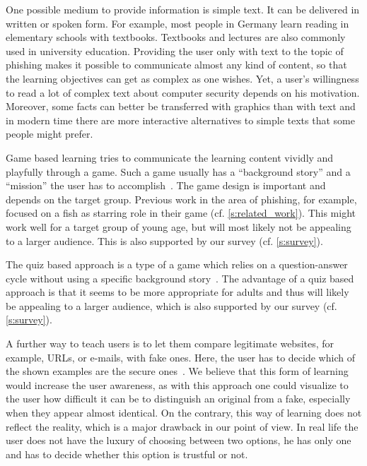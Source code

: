 \begin{description}[leftmargin=0cm]
    \item[Simple Text:] One possible medium to provide information is simple text. It can be delivered in written or spoken form. For example, most people in Germany learn reading in elementary schools with textbooks. 
Textbooks and lectures are also commonly used in university education.
 Providing the user only with text to the topic of phishing makes it possible to communicate almost any kind of content, so that the learning objectives can get as complex as one wishes.
Yet, a user's willingness to read a lot of complex text about computer security depends on his motivation. 
 Moreover, some facts can better be transferred with graphics than with text and in modern time there are more interactive alternatives to simple texts that some people might prefer.
    
	\item[Game Based Learning:] Game based learning tries to communicate the learning content vividly and playfully through a game.
 Such a game usually has a ``background story'' and a ``mission'' the user has to accomplish~\cite{sheng2007antiphishingphil,antiphishingphyllis}. The game design is important and depends on the target group.
 Previous work in the area of phishing, for example, focused on a fish as starring role in their game (cf. \autoref{s:related_work}). This might work well for a target group of young age, but will most likely not be appealing to a larger audience.
 This is also supported by our survey (cf. \autoref{s:survey}).
	\item[Quiz Based Learning] The quiz based approach is a type of a game which relies on a question-answer cycle without using a specific background story~\cite{onguardonline}. The advantage of a quiz based approach is that it seems to be more appropriate for adults and thus will likely be appealing to a larger audience, which is also supported by our survey (cf. \autoref{s:survey}).

	\item[Comparison Based Learning:] A further way to teach users is to let them compare legitimate websites, for example, URLs, or e-mails, with fake ones.
 Here, the user has to decide which of the shown examples are the secure ones~\cite{staysafeonline}. 
We believe that this form of learning would increase the user awareness, as with this approach one could visualize to the user how difficult it can be to distinguish an original from a fake, especially when they appear almost identical.
 On the contrary, this way of learning does not reflect the reality, which is a major drawback in our point of view.
 In real life the user does not have the luxury of choosing between two options, he has only one and has to decide whether this option is trustful or not.


\end{description}
